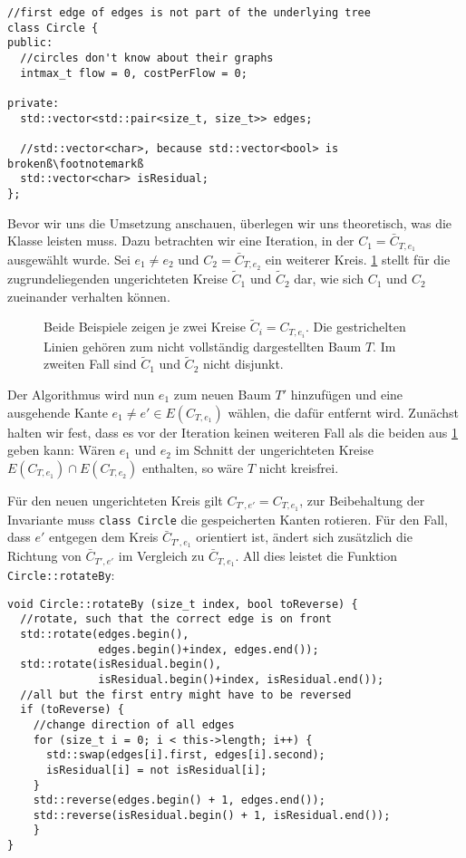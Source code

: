 \begin{lstlisting}[escapechar=ß]
//first edge of edges is not part of the underlying tree
class Circle {
public:
  //circles don't know about their graphs
  intmax_t flow = 0, costPerFlow = 0;

private:
  std::vector<std::pair<size_t, size_t>> edges;
  
  //std::vector<char>, because std::vector<bool> is brokenß\footnotemarkß
  std::vector<char> isResidual;
};
\end{lstlisting}

Bevor wir uns die Umsetzung anschauen, überlegen wir uns theoretisch, was die Klasse leisten muss. Dazu betrachten wir eine Iteration, in der $C_1=\bar{C}_{T,e_1}$ ausgewählt wurde. Sei $e_1\neq e_2$ und $C_2=\bar{C}_{T,e_2}$ ein weiterer Kreis. \cref{fig:circles} stellt für die zugrundeliegenden ungerichteten Kreise $\tilde{C}_1$ und $\tilde{C}_2$ dar, wie sich $C_1$ und $C_2$ zueinander verhalten können.


\begin{figure}[!ht]\centering
    
    \caption{Beide Beispiele zeigen je zwei Kreise $\tilde{C}_i=C_{T,e_i}$. Die gestrichelten Linien gehören zum nicht vollständig dargestellten Baum $T$. Im zweiten Fall sind $\tilde{C}_1$ und $\tilde{C}_2$ nicht disjunkt.}
    \label{fig:circles}
\end{figure}

Der Algorithmus wird nun $e_1$ zum neuen Baum $T'$ hinzufügen und eine ausgehende Kante $e_1\neq e'\in E(C_{T,e_1})$ wählen, die dafür entfernt wird. Zunächst halten wir fest, dass es vor der Iteration keinen weiteren Fall als die beiden aus \cref{fig:circles} geben kann: Wären $e_1$ und $e_2$ im Schnitt der ungerichteten Kreise $E(C_{T,e_1})\cap E(C_{T,e_2})$ enthalten, so wäre $T$ nicht kreisfrei.

Für den neuen ungerichteten Kreis gilt $C_{T',e'}=C_{T,e_1}$, zur Beibehaltung der Invariante muss \lstinline|class Circle| die gespeicherten Kanten rotieren. Für den Fall, dass $e'$ entgegen dem Kreis $\bar{C}_{T',e_1}$ orientiert ist, ändert sich zusätzlich die Richtung von $\bar{C}_{T',e'}$ im Vergleich zu $\bar{C}_{T,e_1}$. All dies leistet die Funktion \lstinline|Circle::rotateBy|:

\begin{lstlisting}
void Circle::rotateBy (size_t index, bool toReverse) {
  //rotate, such that the correct edge is on front
  std::rotate(edges.begin(),
              edges.begin()+index, edges.end());
  std::rotate(isResidual.begin(),
              isResidual.begin()+index, isResidual.end());
  //all but the first entry might have to be reversed
  if (toReverse) {
    //change direction of all edges
    for (size_t i = 0; i < this->length; i++) {
      std::swap(edges[i].first, edges[i].second);
      isResidual[i] = not isResidual[i];
    }
    std::reverse(edges.begin() + 1, edges.end());
    std::reverse(isResidual.begin() + 1, isResidual.end());
    }
}
\end{lstlisting}

